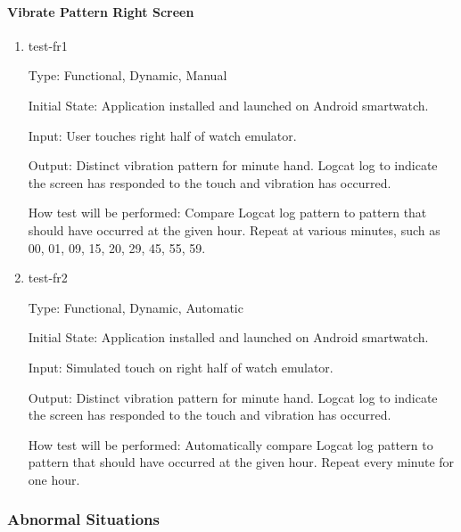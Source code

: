 \paragraph{Vibrate Pattern Right Screen}

\begin{enumerate}

\item{test-fr1\\}

Type: Functional, Dynamic, Manual
					
Initial State: Application installed and launched on Android smartwatch. 
					
Input: User touches right half of watch emulator.
					
Output: Distinct vibration pattern for minute hand. Logcat log to indicate the screen has responded to the touch and vibration has occurred.  
					
How test will be performed: Compare Logcat log pattern to pattern that should have occurred at the given hour. Repeat at various minutes, such as 00, 01, 09, 15, 20, 29, 45, 55, 59. 
					
\item{test-fr2\\}

Type: Functional, Dynamic, Automatic
					
Initial State: Application installed and launched on Android smartwatch. 
					
Input: Simulated touch on right half of watch emulator.
					
Output: Distinct vibration pattern for minute hand. Logcat log to indicate the screen has responded to the touch and vibration has occurred.  
					
How test will be performed: Automatically compare Logcat log pattern to pattern that should have occurred at the given hour. Repeat every minute for one hour.

\end{enumerate}

\subsubsection{Abnormal Situations}

